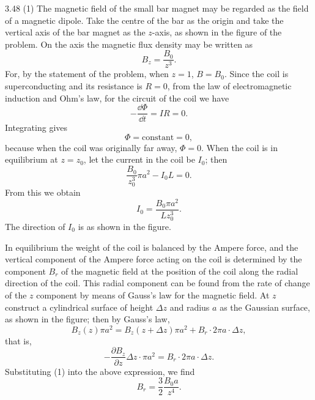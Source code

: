 \begin{solution}{3.48}
(1) The magnetic field of the small bar magnet may be regarded as the field of a magnetic dipole. Take the centre of the bar as the origin and take the vertical axis of the bar magnet as the $z$-axis, as shown in the figure of the problem. On the axis the magnetic flux density may be written as
\begin{equation}
B_z=\frac{B_0}{z^3}. \tag{1}
\end{equation}
For, by the statement of the problem, when $z=1$, $B=B_0$. Since the coil is superconducting and its resistance is $R=0$, from the law of electromagnetic induction and Ohm's law, for the circuit of the coil we have
\[
-\frac{\dd\Phi}{\dd t}=IR=0.
\]
Integrating gives
\begin{equation}
\Phi=\text{constant}=0, \tag{2}
\end{equation}
because when the coil was originally far away, $\Phi=0$. When the coil is in equilibrium at $z=z_0$, let the current in the coil be $I_0$; then
\begin{equation}
\frac{B_0}{z_0^3}\pi a^2-I_0L=0. \tag{3}
\end{equation}
From this we obtain
\begin{equation}
I_0=\frac{B_0\pi a^2}{Lz_0^3}. \tag{4}
\end{equation}
The direction of $I_0$ is as shown in the figure.

In equilibrium the weight of the coil is balanced by the Ampere force, and the vertical component of the Ampere force acting on the coil is determined by the component $B_r$ of the magnetic field at the position of the coil along the radial direction of the coil. This radial component can be found from the rate of change of the $z$ component by means of Gauss's law for the magnetic field. At $z$ construct a cylindrical surface of height $\Delta z$ and radius $a$ as the Gaussian surface, as shown in the figure; then by Gauss's law,
\[
B_z(z)\pi a^2=B_z(z+\Delta z)\pi a^2+B_r\cdot2\pi a\cdot\Delta z,
\]
that is,
\[
-\frac{\partial B_z}{\partial z}\Delta z\cdot\pi a^2=B_r\cdot2\pi a\cdot\Delta z.
\]
Substituting (1) into the above expression, we find
\begin{equation}
B_r=\frac{3}{2}\frac{B_0a}{z^4}. \tag{5}
\end{equation}


\end{solution}
